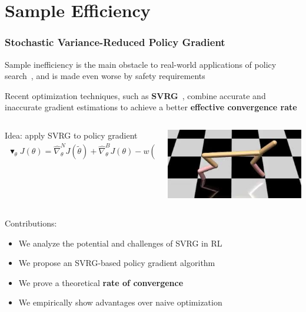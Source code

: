 \documentclass{beamer}
\begin{document}
\section{Sample Efficiency}


\begin{frame}
\frametitle{Stochastic Variance-Reduced Policy Gradient~\cite{papini2018stochastic}}
Sample inefficiency is the main obstacle to real-world applications of policy search~\cite{recht2018tour}, and is made even worse by safety requirements

\vfill

Recent optimization techniques, such as \textbf{SVRG}~\cite{johnson2013accelerating}, combine accurate and inaccurate gradient estimations to achieve a better \textbf{effective convergence rate}

\vfill

\begin{columns}
	\begin{column}{0.59\textwidth}
		Idea: apply SVRG to policy gradient
		\scriptsize
		\begin{align*}
			\blacktriangledown_{\theta}J(\theta) = \widehat{\nabla}_{\theta}^NJ(\widetilde{\theta}) + \widehat{\nabla}_{\theta}^BJ(\theta) - w(\theta,\widetilde{\theta})\widehat{\nabla}_{\theta}^BJ(\theta)
		\end{align*}
	\end{column}
	\begin{column}{0.29\textwidth}
		\includegraphics[width=\textwidth]{pics/cheetah.jpeg}
	\end{column}
\end{columns}

\vfill

Contributions:
\begin{itemize}
	\item We analyze the potential and challenges of SVRG in RL
	\item We propose an SVRG-based policy gradient algorithm
	\item We prove a theoretical \textbf{rate of convergence}
	\item We empirically show advantages over naive optimization
\end{itemize}

\end{frame}
\end{document}
